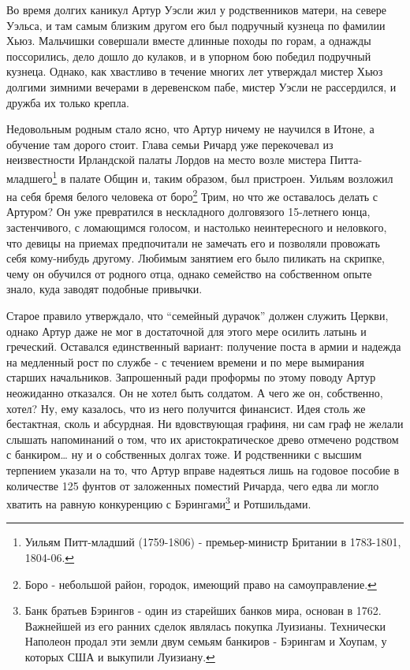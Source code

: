 \documentclass[
  oneside,
  12pt,
  titlepage]{book}
\begin{document}
Во время долгих каникул Артур Уэсли жил у родственников матери, на севере Уэльса, и там самым близким другом его был подручный кузнеца по фамилии Хьюз. Мальчишки совершали вместе длинные походы по горам, а однажды поссорились, дело дошло до кулаков, и в упорном бою победил подручный кузнеца. Однако, как хвастливо в течение многих лет утверждал мистер Хьюз долгими зимними вечерами в деревенском пабе, мистер Уэсли не рассердился, и дружба их только крепла.

Недовольным родным стало ясно, что Артур ничему не научился в Итоне, а обучение там дорого стоит. Глава семьи Ричард уже перекочевал из неизвестности Ирландской палаты Лордов на место возле мистера Питта-младшего\footnote{Уильям Питт-младший (1759-1806) - премьер-министр Британии в 1783-1801, 1804-06.} в палате Общин и, таким образом, был пристроен. Уильям возложил на себя бремя белого человека от боро\footnote{Боро - небольшой район, городок, имеющий право на самоуправление.} Трим, но что же оставалось делать с Артуром? Он уже превратился в нескладного долговязого 15-летнего юнца, застенчивого, с ломающимся голосом, и настолько неинтересного и неловкого, что девицы на приемах предпочитали не замечать его и позволяли провожать себя кому-нибудь другому. Любимым занятием его было пиликать на скрипке, чему он обучился от родного отца, однако семейство на собственном опыте знало, куда заводят подобные привычки.

Старое правило утверждало, что ``семейный дурачок'' должен служить Церкви, однако Артур даже не мог в достаточной для этого мере осилить латынь и греческий. Оставался единственный вариант: получение поста в армии и надежда на медленный рост по службе - с течением времени и по мере вымирания старших начальников. Запрошенный ради проформы по этому поводу Артур неожиданно отказался. Он не хотел быть солдатом. А чего же он, собственно, хотел? Ну, ему казалось, что из него получится финансист. Идея столь же бестактная, сколь и абсурдная. Ни вдовствующая графиня, ни сам граф не желали слышать напоминаний о том, что их аристократическое древо отмечено родством с банкиром\ldots{} ну и о собственных долгах тоже. И родственники с высшим терпением указали на то, что Артур вправе надеяться лишь на годовое пособие в количестве 125 фунтов от заложенных поместий Ричарда, чего едва ли могло хватить на равную конкуренцию с Бэрингами\footnote{Банк братьев Бэрингов - один из старейших банков мира, основан в 1762. Важнейшей из его ранних сделок являлась покупка Луизианы. Технически Наполеон продал эти земли двум семьям банкиров - Бэрингам и Хоупам, у которых США и выкупили Луизиану.} и Ротшильдами.
\end{document}
